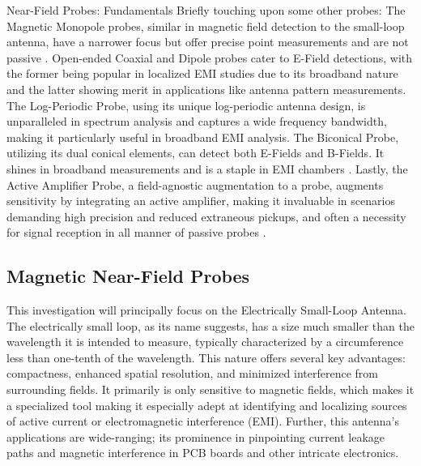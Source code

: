 \documentclass[12pt]{article}
\begin{document}
\begin{section} {Near-Field Probes: Fundamentals}
Briefly touching upon some other probes: The Magnetic Monopole probes, similar in magnetic field detection to the small-loop antenna, have a narrower focus but offer precise point measurements and are not passive \cite{kanda_standard_1994}. Open-ended Coaxial and Dipole probes cater to E-Field detections, with the former being popular in localized EMI studies due to its broadband nature and the latter showing merit in applications like antenna pattern measurements. The Log-Periodic Probe, using its unique log-periodic antenna design, is unparalleled in spectrum analysis and captures a wide frequency bandwidth, making it particularly useful in broadband EMI analysis. The Biconical Probe, utilizing its dual conical elements, can detect both E-Fields and B-Fields. It shines in broadband measurements and is a staple in EMI chambers \cite{dyson_characteristics_1965}. Lastly, the Active Amplifier Probe, a field-agnostic augmentation to a probe, augments sensitivity by integrating an active amplifier, making it invaluable in scenarios demanding high precision and reduced extraneous pickups, and often a necessity for signal reception in all manner of passive probes \cite{huang_antennas_2021}.

\subsection{Magnetic Near-Field Probes}

This investigation will principally focus on the Electrically Small-Loop Antenna. The electrically small loop, as its name suggests, has a size much smaller than the wavelength it is intended to measure, typically characterized by a circumference less than one-tenth of the wavelength. This nature offers several key advantages: compactness, enhanced spatial resolution, and minimized interference from surrounding fields. It primarily is only sensitive to magnetic fields, which makes it a specialized tool making it especially adept at identifying and localizing sources of active current or electromagnetic interference (EMI). Further, this antenna's applications are wide-ranging; its prominence in pinpointing current leakage paths and magnetic interference in PCB boards and other intricate electronics.


\end{section}
\end{document}

